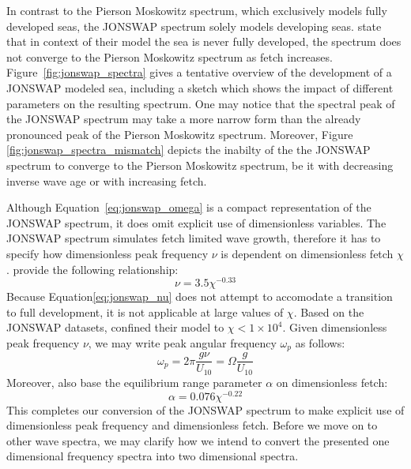 In contrast to the Pierson Moskowitz spectrum, which exclusively models fully 
developed seas, the JONSWAP spectrum solely models developing seas.
\citeauthor{article:Hasselman1973} state that in context of their model the sea is never fully developed, 
the spectrum does not converge to the Pierson Moskowitz spectrum as fetch 
increases. Figure~\ref{fig:jonswap_spectra} gives a tentative overview of the 
development of a JONSWAP modeled sea, including a sketch which shows the impact 
of different parameters on the resulting spectrum. One may notice that the 
spectral peak of the JONSWAP spectrum may take a more narrow form than the 
already pronounced peak of the Pierson Moskowitz spectrum. Moreover, Figure 
\ref{fig:jonswap_spectra_mismatch} depicts the inabilty of the the JONSWAP 
spectrum to converge to the Pierson Moskowitz spectrum, be it with decreasing 
inverse wave age or with increasing fetch.

Although Equation~\ref{eq:jonswap_omega} is a compact representation of the
JONSWAP spectrum, it does omit explicit use of dimensionless variables.
The JONSWAP spectrum simulates fetch limited wave growth, therefore it has to
specify how dimensionless peak frequency $\nu$ is dependent on dimensionless
fetch $\chi$. \citeauthor{article:Hasselman1973} provide the following relationship:
\begin{equation}
\label{eq:jonswap_nu}
 \nu = 3.5\chi^{-0.33}
\end{equation}
Because Equation\ref{eq:jonswap_nu} does not attempt to accomodate a transition 
to full development, it is not applicable at large values of $\chi$. Based on 
the JONSWAP datasets, \citeauthor{article:Hasselman1973} confined their model
to $\chi < 1\times10^4$. Given dimensionless peak frequency $\nu$, we may write
peak  angular frequency $\omega_p$ as follows:
\begin{equation}
 \omega_p = 2\pi\frac{g\nu}{U_{10}} = \Omega\frac{g}{U_{10}}
\end{equation}
Moreover, \citeauthor{article:Hasselman1973} also base the equilibrium range
parameter $\alpha$ on dimensionless fetch:
\begin{equation}
 \alpha = 0.076 \chi^{-0.22}
\end{equation}
%
This completes our conversion of the JONSWAP spectrum to make explicit use of 
dimensionless peak frequency and dimensionless fetch.
Before we move on to other wave spectra, we may clarify how we intend to
convert the presented one dimensional frequency spectra into two dimensional
\wavenumber spectra.
%
